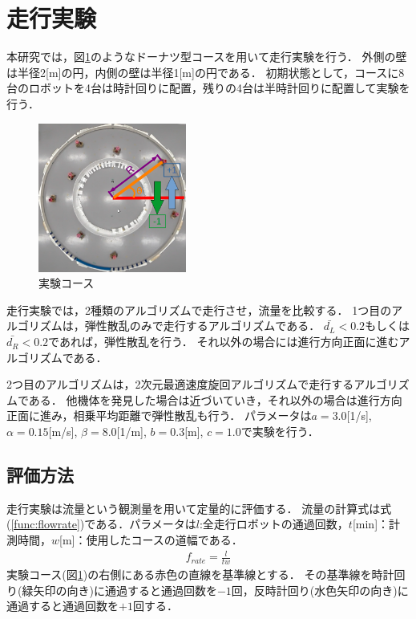 \documentclass[twocolumn,dvipdfmx]{jarticle}
\begin{document}
\section{走行実験}
本研究では，図\ref{fig:cource}のようなドーナツ型コースを用いて走行実験を行う．
外側の壁は半径2[m]の円，内側の壁は半径1[m]の円である．
初期状態として，コースに8台のロボットを4台は時計回りに配置，残りの4台は半時計回りに配置して実験を行う．
\begin{figure}[ht]
\begin{center}
  \includegraphics[height=4.9cm,width=0.7\linewidth]{pic/cource3.png}
  \caption{実験コース}
  \label{fig:cource}
\end{center}
\end{figure}
走行実験では，2種類のアルゴリズムで走行させ，流量を比較する．
1つ目のアルゴリズムは，弾性散乱のみで走行するアルゴリズムである．
$\bar{d_{L}} < 0.2$もしくは$\bar{d_{R}} < 0.2$であれば，弾性散乱を行う．
それ以外の場合には進行方向正面に進むアルゴリズムである．

2つ目のアルゴリズムは，2次元最適速度旋回アルゴリズムで走行するアルゴリズムである．
他機体を発見した場合は近づいていき，それ以外の場合は進行方向正面に進み，相乗平均距離で弾性散乱も行う．
パラメータは$a=3.0$[1/s], $\alpha=0.15$[m/s], $\beta=8.0$[1/m], $b=0.3$[m], $c=1.0$で実験を行う．
\vspace{-2.5mm}
\subsection{評価方法}
走行実験は流量という観測量を用いて定量的に評価する．
流量の計算式は式(\ref{func:flowrate})である．パラメータは$l$:全走行ロボットの通過回数，$t$[min]：計測時間，$w$[m]：使用したコースの道幅である．
\vspace{-2.0mm}
\begin{eqnarray}
f_{rate} = \frac{l}{tw}
\label{func:flowrate}
\end{eqnarray}
実験コース(図\ref{fig:cource})の右側にある赤色の直線を基準線とする．
その基準線を時計回り(緑矢印の向き)に通過すると通過回数を$-1$回，反時計回り(水色矢印の向き)に通過すると通過回数を$+1$回する．
\vspace{-2mm}
\end{document}
